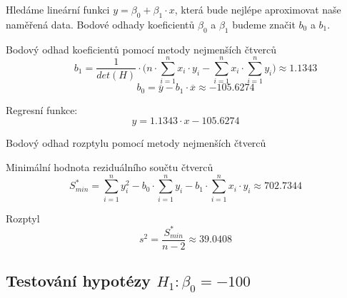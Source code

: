 \begin{compactitem}
    \item Hledáme lineární funkci ${\displaystyle y = \beta_0 + \beta_1 \cdot x}$, která bude nejlépe aproximovat naše naměřená data. Bodové odhady koeficientů ${\displaystyle \beta_0}$ a ${\displaystyle \beta_1}$ budeme značit ${\displaystyle b_0}$ a ${\displaystyle b_1}$.

    \item Bodový odhad koeficientů pomocí metody nejmenších čtverců
    $${\displaystyle \qquad b_1 = \frac{1} {det(H)} \cdot \Bigg( n \cdot \sum_{i=1}^n x_i \cdot y_i - \sum_{i=1}^n x_i \cdot \sum_{i=1}^n y_i \Bigg) \approx 1.1343 }$$
    $${\displaystyle \qquad b_0 = \overline{y} - b_1 \cdot \overline{x} \approx -105.6274}$$ \begin{compactitem}
        \item Regresní funkce: $${\displaystyle y = 1.1343 \cdot x - 105.6274}$$
    \end{compactitem}

    \item Bodový odhad rozptylu pomocí metody nejmenších čtverců \begin{compactitem}
        \item Minimální hodnota reziduálního součtu čtverců
        $${\displaystyle S^*_{min} = \sum_{i=1}^n y_i^2 - b_0 \cdot \sum_{i=1}^n y_i - b_1 \cdot \sum_{i=1}^n x_i \cdot y_i \approx 702.7344}$$

        \item Rozptyl
        $${\displaystyle s^2 = \frac{S^*_{min}} {n-2} \approx 39.0408}$$

    \end{compactitem}
\end{compactitem}

\subsection{Testování hypotézy ${\displaystyle H_1 : \beta_0 = -100}$}

